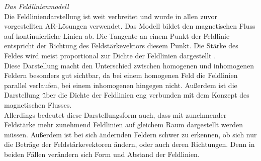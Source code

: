 \textit{Das Feldlinienmodell}\\
Die Feldliniendarstellung ist weit verbreitet und wurde in allen zuvor vorgestellten AR-Lösungen verwendet. Das Modell bildet den magnetischen Fluss auf kontinuierliche Linien ab. Die Tangente an einem Punkt der Feldlinie entspricht der Richtung des Feldstärkevektors diesem Punkt. Die Stärke des Feldes wird meist proportional zur Dichte der Feldlinien dargestellt \cite{Kilian03}.\\

Diese Darstellung macht den Unterschied zwischen homogenen und inhomogenen Feldern besonders gut sichtbar, da bei einem homogenen Feld die Feldlinien parallel verlaufen, bei einem inhomogenen hingegen nicht. Außerdem ist die Darstellung über die Dichte der Feldlinien eng verbunden mit dem Konzept des magnetischen Flusses.\\

Allerdings bedeutet diese Darstellungsform auch, dass mit zunehmender Feldstärke mehr zunehmend Feldlinien auf gleichem Raum dargestellt werden müssen. Außerdem ist bei sich ändernden Feldern schwer zu erkennen, ob sich nur die Beträge der Feldstärkevektoren ändern, oder auch deren Richtungen. Denn in beiden Fällen verändern sich Form und Abstand der Feldlinien.\\

